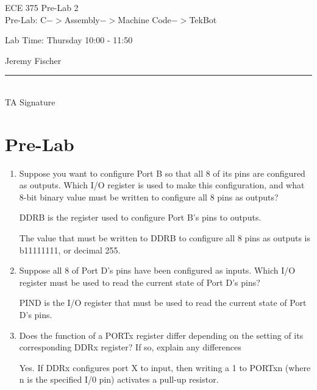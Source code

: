 \documentclass[12pt,letterpaper]{article}
\begin{document}
\begin{titlepage}
    \vspace*{4cm}
    \begin{flushright}
    {\huge
        ECE 375 Pre-Lab 2\\[1cm]
    }
    {\large
       Pre-Lab: C$->$Assembly$->$Machine Code$->$TekBot
    }
    \end{flushright}
    \begin{flushleft}
    Lab Time: Thursday 10:00 - 11:50
    \end{flushleft}
    \begin{flushright}
    Jeremy Fischer
    
    \vfill
    \rule{5in}{.5mm}\\
    TA Signature
    \end{flushright}

\end{titlepage}


\section{Pre-Lab}

\begin{enumerate}
	\item 
	Suppose you want to configure Port B so that all 8 of its pins are configured as outputs. 
	Which I/O register is used to make this configuration, and what 8-bit binary value must be written to configure all 8 pins as outputs?
	
	DDRB is the register used to configure Port B's pins to outputs.
	
	The value that must be written to DDRB to configure all 8 pins as outputs is b11111111, or decimal 255.
	
	\item 
	Suppose all 8 of Port D's pins have been configured as inputs. 
	Which I/O register must be used to read the current state of Port D's pins?
	
	PIND is the I/O register that must be used to read the current state of Port D's pins.
	
	\item 
	 Does the function of a PORTx register differ depending on the setting of its corresponding DDRx register? 
	 If so, explain any differences
	 
	 Yes. If DDRx configures port X to input, then writing a 1 to PORTxn (where n is the specified I/0 pin) activates a pull-up resistor.
\end{enumerate}
\end{document}
